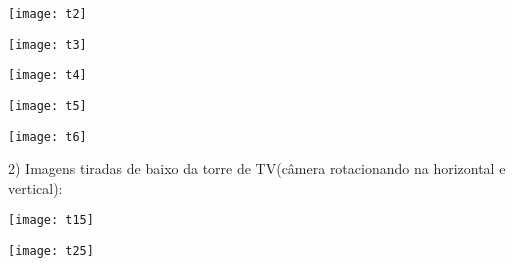 \documentclass[conference]{IEEEtran}
\begin{document}
		\vspace{2\baselineskip}\vspace{-\parskip}
		\begin{minipage}{\linewidth}
  		\centering
  		\texttt{[image: t2]}
		\end{minipage}
		
		\vspace{2\baselineskip}\vspace{-\parskip}
		\begin{minipage}{\linewidth}
  		\centering
  		\texttt{[image: t3]}
		\end{minipage}
		
		\vspace{2\baselineskip}\vspace{-\parskip}
		\begin{minipage}{\linewidth}
  		\centering
  		\texttt{[image: t4]}
		\end{minipage}
		
		\vspace{2\baselineskip}\vspace{-\parskip}
		\begin{minipage}{\linewidth}
  		\centering
  		\texttt{[image: t5]}
		\end{minipage}
		
		\vspace{2\baselineskip}\vspace{-\parskip}
		\begin{minipage}{\linewidth}
  		\centering
  		\texttt{[image: t6]}
		\end{minipage}


2) Imagens tiradas de baixo da torre de TV(c\^amera rotacionando na horizontal e vertical):

		\vspace{2\baselineskip}\vspace{-\parskip}
		\begin{minipage}{\linewidth}
  		\centering
  		\texttt{[image: t15]}
		\end{minipage}
		
		\vspace{2\baselineskip}\vspace{-\parskip}
		\begin{minipage}{\linewidth}
  		\centering
  		\texttt{[image: t25]}
		\end{minipage}
		
\end{document}
